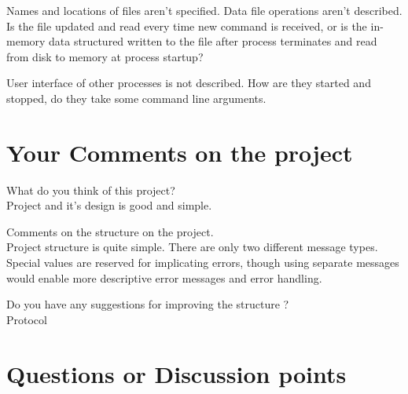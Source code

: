 \documentclass{article}
\begin{document}
Names and locations of files aren't specified. Data file operations aren't described. Is the file updated and read every time new command is received, or is the in-memory data structured written to the file after process terminates and read from disk to memory at process startup?

User interface of other processes is not described. How are they started and stopped, do they take some command line arguments.
\section{Your Comments on the project}
What do you think of this project?\\
Project and it's design is good and simple.

Comments on the structure on the project.\\
Project structure is quite simple. There are only two different message types. Special values are reserved for implicating errors, though using separate messages would enable more descriptive error messages and error handling. 

Do you have any suggestions for improving the structure ? \\
Protocol

\section{Questions or Discussion points}
\end{document}
